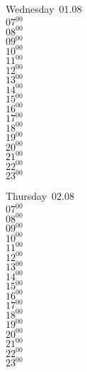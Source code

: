 \documentclass[11pt, a4paper]{book}\usepackage[]{graphicx}\usepackage[]{color}
\begin{document}
\begin{weekdaybox}
  Wednesday~01.08\\
  { 
  \vfill
  $07^{00}$\\
$08^{00}$\\
$09^{00}$\\
$10^{00}$\\
$11^{00}$\\
$12^{00}$\\
$13^{00}$\\
$14^{00}$\\
$15^{00}$\\
$16^{00}$\\
$17^{00}$\\
$18^{00}$\\
$19^{00}$\\
$20^{00}$\\
$21^{00}$\\
$22^{00}$\\
$23^{00}$\\
  }
\end{weekdaybox}
\clearpage
\begin{headerbox}
\end{headerbox}
\begin{weekdaybox}
  Thursday~02.08\\
  { 
  \vfill
  $07^{00}$\\
$08^{00}$\\
$09^{00}$\\
$10^{00}$\\
$11^{00}$\\
$12^{00}$\\
$13^{00}$\\
$14^{00}$\\
$15^{00}$\\
$16^{00}$\\
$17^{00}$\\
$18^{00}$\\
$19^{00}$\\
$20^{00}$\\
$21^{00}$\\
$22^{00}$\\
$23^{00}$\\
  }
\end{weekdaybox} 
\end{document}
